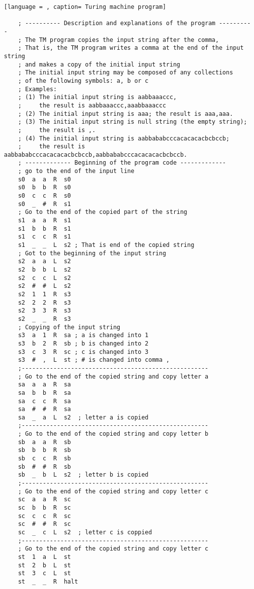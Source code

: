\documentclass[12pt, a4paper, bibliography=totocnumbered]{report}
\begin{document}
\lstset{style=mystyle}

	\begin{lstlisting}[language = , caption= Turing machine program] 
	
    ; ---------- Description and explanations of the program ----------
    ; The TM program copies the input string after the comma,
    ; That is, the TM program writes a comma at the end of the input string
    ; and makes a copy of the initial input string 
    ; The initial input string may be composed of any collections
    ; of the following symbols: a, b or c
    ; Examples:
    ; (1) The initial input string is aabbaaaccc, 
    ;     the result is aabbaaaccc,aaabbaaaccc
    ; (2) The initial input string is aaa; the result is aaa,aaa.
    ; (3) The initial input string is null string (the empty string);
    ;     the result is ,.
    ; (4) The initial input string is aabbababcccacacacacbcbccb;
    ;     the result is aabbababcccacacacacbcbccb,aabbababcccacacacacbcbccb.
    ; ------------- Beginning of the program code -------------
    ; go to the end of the input line
    s0  a  a  R  s0
    s0  b  b  R  s0
    s0  c  c  R  s0
    s0  _  #  R  s1
    ; Go to the end of the copied part of the string
    s1  a  a  R  s1
    s1  b  b  R  s1
    s1  c  c  R  s1
    s1  _  _  L  s2 ; That is end of the copied string
    ; Got to the beginning of the input string
    s2  a  a  L  s2
    s2  b  b  L  s2
    s2  c  c  L  s2
    s2  #  #  L  s2
    s2  1  1  R  s3 
    s2  2  2  R  s3 
    s2  3  3  R  s3 
    s2  _  _  R  s3 
    ; Copying of the input string
    s3  a  1  R  sa ; a is changed into 1
    s3  b  2  R  sb ; b is changed into 2
    s3  c  3  R  sc ; c is changed into 3
    s3  #  ,  L  st ; # is changed into comma ,
    ;-----------------------------------------------------
    ; Go to the end of the copied string and copy letter a
    sa  a  a  R  sa
    sa  b  b  R  sa
    sa  c  c  R  sa
    sa  #  #  R  sa
    sa  _  a  L  s2  ; letter a is copied
    ;-----------------------------------------------------
    ; Go to the end of the copied string and copy letter b
    sb  a  a  R  sb
    sb  b  b  R  sb
    sb  c  c  R  sb
    sb  #  #  R  sb
    sb  _  b  L  s2  ; letter b is copied
    ;-----------------------------------------------------
    ; Go to the end of the copied string and copy letter c
    sc  a  a  R  sc
    sc  b  b  R  sc
    sc  c  c  R  sc
    sc  #  #  R  sc
    sc  _  c  L  s2  ; letter c is coppied
    ;-----------------------------------------------------
    ; Go to the end of the copied string and copy letter c
    st  1  a  L  st
    st  2  b  L  st
    st  3  c  L  st
    st  _  _  R  halt

\end{lstlisting} \label{programListing}
\end{document}
